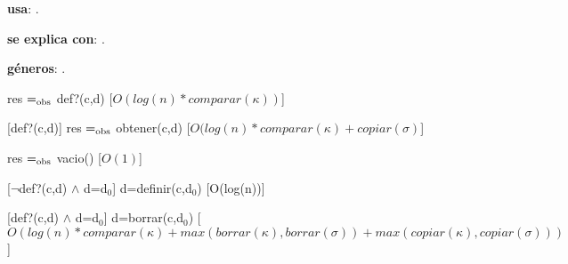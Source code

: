 \begin{Interfaz}
  
  \textbf{usa}: .
  
  \textbf{se explica con}: .

  \textbf{g\'eneros}: .


  {res $=_{\mathrm{obs}}$ def?(c,d)}%
  [$O(log(n) * comparar(\kappa))$]

  [def?(c,d)]
  {res $=_{\mathrm{obs}}$ obtener(c,d)}%
  [$O(log(n) * comparar(\kappa) + copiar(\sigma)$]
  
  {res $=_{\mathrm{obs}}$ vacio()}%
  [$O(1)$]
  
  [$\neg$def?(c,d) $\wedge$ d=d$_0$]
  {d=definir(c,d$_0$)}%
  [O(log(n))]
  
  [def?(c,d) $\wedge$ d=d$_0$]
  {d=borrar(c,d$_0$)}%
  [$O(log(n) * comparar(\kappa) + max(borrar(\kappa), borrar(\sigma)) + max(copiar(\kappa), copiar(\sigma)))$]

\end{Interfaz}

\newpage 

